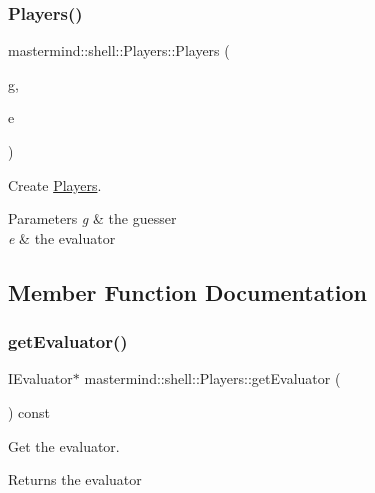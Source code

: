 \subsubsection{\texorpdfstring{Players()}{Players()}}
{\footnotesize\ttfamily mastermind\+::shell\+::\+Players\+::\+Players (\begin{DoxyParamCaption}\item[{I\+Guesser $\ast$}]{g,  }\item[{I\+Evaluator $\ast$}]{e }\end{DoxyParamCaption})\hspace{0.3cm}{\ttfamily [inline]}}



Create \hyperlink{classmastermind_1_1shell_1_1_players}{Players}. 


\begin{DoxyParams}{Parameters}
{\em g} & the guesser \\
\hline
{\em e} & the evaluator \\
\hline
\end{DoxyParams}


\subsection{Member Function Documentation}
\hypertarget{classmastermind_1_1shell_1_1_players_ad79169b7a2096cac0b161d6ed015023f}{}\label{classmastermind_1_1shell_1_1_players_ad79169b7a2096cac0b161d6ed015023f} 
\subsubsection{\texorpdfstring{get\+Evaluator()}{getEvaluator()}}
{\footnotesize\ttfamily I\+Evaluator$\ast$ mastermind\+::shell\+::\+Players\+::get\+Evaluator (\begin{DoxyParamCaption}{ }\end{DoxyParamCaption}) const\hspace{0.3cm}{\ttfamily [inline]}}



Get the evaluator. 

\begin{DoxyReturn}{Returns}
the evaluator 
\end{DoxyReturn}
\hypertarget{classmastermind_1_1shell_1_1_players_a66aa10a32b7469eea4f8668ac995cf73}{}\label{classmastermind_1_1shell_1_1_players_a66aa10a32b7469eea4f8668ac995cf73} 
